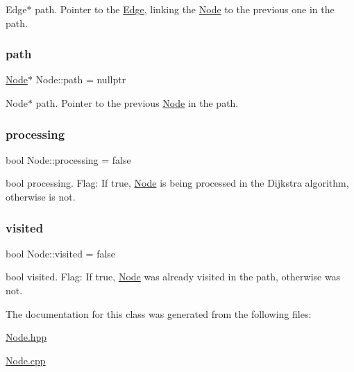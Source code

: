 Edge$\ast$ path. Pointer to the \hyperlink{class_edge}{Edge}, linking the \hyperlink{class_node}{Node} to the previous one in the path. \hypertarget{class_node_a569c555f532e04a5ef976a54cd3c82a0}{}\label{class_node_a569c555f532e04a5ef976a54cd3c82a0} 
\subsubsection{\texorpdfstring{path}{path}}
{\footnotesize\ttfamily \hyperlink{class_node}{Node}$\ast$ Node\+::path = nullptr}

Node$\ast$ path. Pointer to the previous \hyperlink{class_node}{Node} in the path. \hypertarget{class_node_ac54c0bde41664161566c30ccf4f8a53e}{}\label{class_node_ac54c0bde41664161566c30ccf4f8a53e} 
\subsubsection{\texorpdfstring{processing}{processing}}
{\footnotesize\ttfamily bool Node\+::processing = false}

bool processing. Flag\+: If true, \hyperlink{class_node}{Node} is being processed in the Dijkstra algorithm, otherwise is not. \hypertarget{class_node_aa1bdec4e775fc578632e6a2dced9e251}{}\label{class_node_aa1bdec4e775fc578632e6a2dced9e251} 
\subsubsection{\texorpdfstring{visited}{visited}}
{\footnotesize\ttfamily bool Node\+::visited = false}

bool visited. Flag\+: If true, \hyperlink{class_node}{Node} was already visited in the path, otherwise was not. 

The documentation for this class was generated from the following files\+:\begin{DoxyCompactItemize}
\item 
\hyperlink{_node_8hpp}{Node.\+hpp}\item 
\hyperlink{_node_8cpp}{Node.\+cpp}\end{DoxyCompactItemize}
